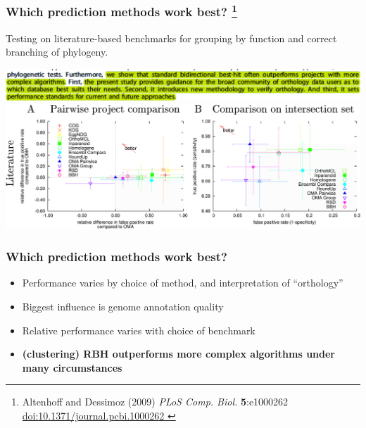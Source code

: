 % 
\begin{frame}
  \frametitle{Which prediction methods work best?
    \footnote{\tiny{Altenhoff and Dessimoz (2009) \textit{PLoS Comp. Biol.} \textbf{5}:e1000262 \href{http://dx.doi.org/10.1371/journal.pcbi.1000262}{doi:10.1371/journal.pcbi.1000262
    }}}
  }
  Testing on literature-based benchmarks for grouping by function and correct branching of phylogeny.  \begin{center}
      \includegraphics[width=\textwidth]{images/altenhoff1} \\
      \includegraphics[width=\textwidth]{images/altenhoff2}      
  \end{center}
\end{frame}

% 
\begin{frame}
  \frametitle{Which prediction methods work best?}
  \begin{itemize}
    \item \textcolor{hutton_green}{Performance varies by choice of method, and interpretation of ``orthology''}
    \item \textcolor{hutton_blue}{Biggest influence is genome annotation quality}
    \item Relative performance varies with choice of benchmark
    \item \textcolor{hutton_purple}{\textbf{(clustering) RBH outperforms more complex algorithms under many circumstances}}
  \end{itemize}
\end{frame}

